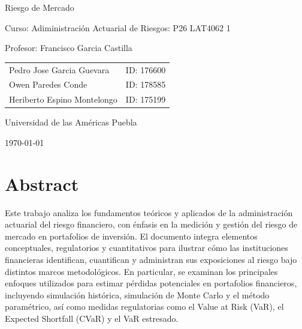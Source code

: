 \begin{titlepage}
\centering
\vspace*{4cm}
{\extrabold\fontsize{28pt}{28pt}\selectfont Riesgo de Mercado\par}
\vspace{1cm}

{\medium\fontsize{12pt}{12pt}\selectfont
{\large Curso:  Adiministración Actuarial de Riesgos: P26 LAT4062 1\par}
\vspace{.5em}
{\large Profesor:  Francisco Garcia Castilla\par}
\vspace{.5em}

{\large
\begin{tabular}{@{} l l @{}}
Pedro Jose Garcia Guevara      & ID: 176600 \\
Owen Paredes Conde        & ID: 178585 \\
Heriberto Espino Montelongo & ID: 175199 \\
\end{tabular}\par
}

\vspace{.5em}
{\large Universidad de las Américas Puebla\par}
\vfill
{\large \today \par}}
\end{titlepage}



\section*{Abstract}

Este trabajo analiza los fundamentos teóricos y aplicados de la administración actuarial del riesgo financiero, con énfasis en la medición y gestión del riesgo de mercado en portafolios de inversión. El documento integra elementos conceptuales, regulatorios y cuantitativos para ilustrar cómo las instituciones financieras identifican, cuantifican y administran sus exposiciones al riesgo bajo distintos marcos metodológicos. En particular, se examinan los principales enfoques utilizados para estimar pérdidas potenciales en portafolios financieros, incluyendo simulación histórica, simulación de Monte Carlo y el método paramétrico, así como medidas regulatorias como el Value at Risk (VaR), el Expected Shortfall (CVaR) y el VaR estresado.


